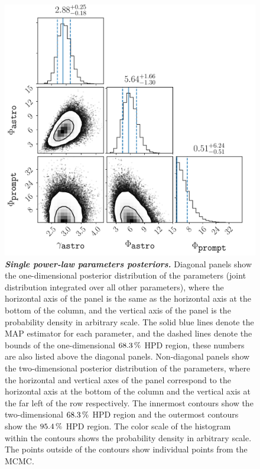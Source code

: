 \begin{figure}
	\centering
	\includegraphics[width=\linewidth]{figures/hese_paper/spl_posterior}
	\internallinenumbers
	\caption{\textbf{\textit{Single power-law parameters posteriors.}}
		Diagonal panels show the one-dimensional posterior distribution of the parameters (joint distribution integrated over all other parameters), where the horizontal axis of the panel is the same as the horizontal axis at the bottom of the column, and the vertical axis of the panel is the probability density in arbitrary scale.
		The solid blue lines denote the MAP estimator for each parameter, and the dashed lines denote the bounds of the one-dimensional $\SI{68.3}\percent$ HPD region, these numbers are also listed above the diagonal panels.
		Non-diagonal panels show the two-dimensional posterior distribution of the parameters, where the horizontal and vertical axes of the panel correspond to the horizontal axis at the bottom of the column and the vertical axis at the far left of the row respectively.
		The innermost contours show the two-dimensional $\SI{68.3}\percent$ HPD region and the outermost contours show the $\SI{95.4}\percent$ HPD region.
		The color scale of the histogram within the contours shows the probability density in arbitrary scale.
		The points outside of the contours show individual points from the MCMC.}\label{fig:SPL_posterior}
\end{figure}

